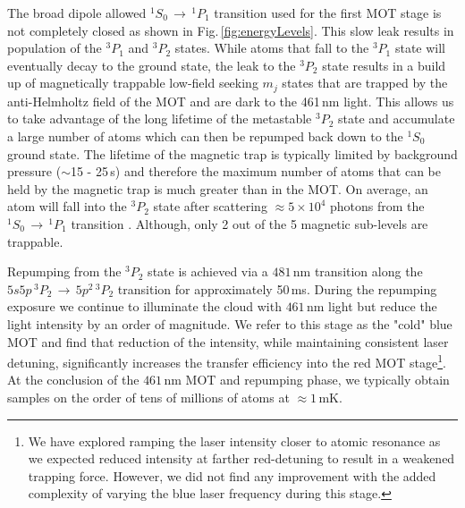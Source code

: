 The broad dipole allowed $^1S_0\,\rightarrow\,^1P_1$ transition used for the first MOT stage is not completely closed as shown in Fig.\,\ref{fig:energyLevels}.
This slow leak results in population of the $^3P_1$ and $^3P_2$ states.
While atoms that fall to the $^3P_1$ state will eventually decay to the ground state, the leak to the $^3P_2$ state results in a build up of magnetically trappable low-field seeking $m_j$ states that are trapped by the anti-Helmholtz field of the MOT and are dark to the 461\,nm light.
This allows us to take advantage of the long lifetime of the metastable $^3P_2$ state and accumulate a large number of atoms which can then be repumped back down to the $^1S_0$ ground state.
The lifetime of the magnetic trap is typically limited by background pressure ($\sim$15 - 25\,s) and therefore the maximum number of atoms that can be held by the magnetic trap is much greater than in the MOT.
On average, an atom will fall into the $^3P_2$ state after scattering $\approx5\times10^4$ photons from the $^1S_0\,\rightarrow\,^1P_1$ transition \cite{Cooper2018}.
Although, only 2 out of the 5 magnetic sub-levels are trappable.

Repumping from the $^3P_2$ state is achieved via a $481\,$nm transition along the $5s5p\,^3P_2\,\rightarrow\,5p^2\,^3P_2$ transition for approximately 50\,ms.
During the repumping exposure we continue to illuminate the cloud with $461\,$nm light but reduce the light intensity by an order of magnitude.
We refer to this stage as the "cold" blue MOT and find that reduction of the intensity, while maintaining consistent laser detuning, significantly increases the transfer efficiency into the red MOT stage\footnote{We have explored ramping the laser intensity closer to atomic resonance as we expected reduced intensity at farther red-detuning to result in a weakened trapping force.
However, we did not find any improvement with the added complexity of varying the blue laser frequency during this stage.}.
At the conclusion of the $461\,$nm MOT and repumping phase, we typically obtain samples on the order of tens of millions of atoms at $\approx1\,$mK.

